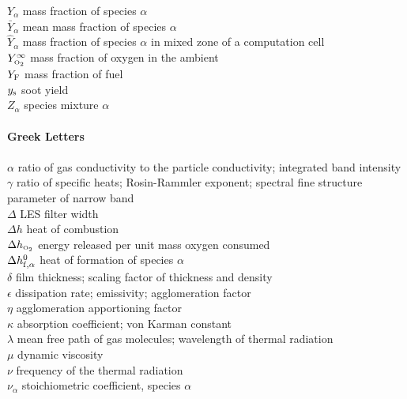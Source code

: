\begin{tabbing}
$Y_\alpha$                \> mass fraction of species $\alpha$   \\
$\bar{Y}_\alpha$          \> mean mass fraction of species $\alpha$   \\
$\hat{Y}_\alpha$          \> mass fraction of species $\alpha$ in mixed zone of a computation cell \\
$Y_{\text{\tiny \hbox{O}$_2$}}^\infty$          \> mass fraction of oxygen in the ambient   \\
$Y_{\rm F}$               \> mass fraction of fuel   \\
$y_{\rm s}$               \> soot yield \\
$Z_\alpha$                \> species mixture $\alpha$   \\
\hspace{0.1in}            \> \\
{\bf Greek Letters}       \> \\
\hspace{0.1in}            \> \\
$\alpha$                  \> ratio of gas conductivity to the particle conductivity; integrated band intensity \\
$\gamma$                  \> ratio of specific heats; Rosin-Rammler exponent; spectral fine structure parameter of narrow band \\
$\Delta$                  \> LES filter width \\
$\Delta h$                \> heat of combustion \\
$\Delta h_{\text{\tiny \hbox{O}$_2$}}$          \> energy released per unit mass oxygen consumed \\
$\Delta h_{\rm f,\alpha}^0$ \> heat of formation of species $\alpha$ \\
$\delta$                  \> film thickness; scaling factor of thickness and density \\
$\epsilon$                \> dissipation rate; emissivity; agglomeration factor \\
$\eta$                    \> agglomeration apportioning factor \\
$\kappa$                  \> absorption coefficient; von Karman constant \\
$\lambda$                 \> mean free path of gas molecules; wavelength of thermal radiation\\
$\mu$                     \> dynamic viscosity \\
$\nu$                     \> frequency of the thermal radiation \\
$\nu_\alpha$              \> stoichiometric coefficient, species $\alpha$ \\

\end{tabbing}
